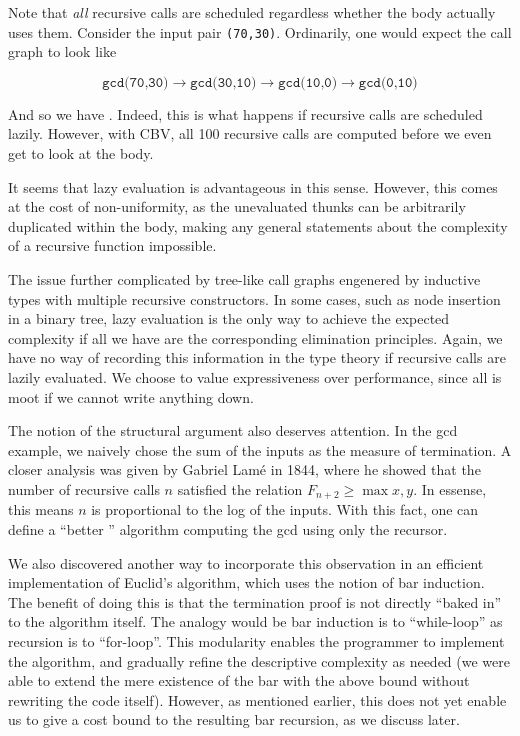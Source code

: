 Note that \emph{all} recursive calls are scheduled regardless whether the body actually 
uses them. Consider the input pair \texttt{(70,30)}. Ordinarily, one would expect the
call graph to look like 

\[
\texttt{gcd(70,30)} \to \texttt{gcd(30,10)} \to \texttt{gcd(10,0)} \to \texttt{gcd(0,10)} 
\]

And so we have . Indeed, this is what happens if recursive calls 
are scheduled lazily. However, with CBV, all 100 recursive calls are 
computed before we even get to look at the body. 

It seems that lazy evaluation is advantageous in this sense. However, this comes at the 
cost of non-uniformity, as the unevaluated thunks can be arbitrarily duplicated within
the body, making any general statements about the complexity of a recursive function 
impossible. 

The issue further complicated by tree-like call graphs engenered by inductive types with
multiple recursive constructors. In some cases, such as node insertion in a binary tree,
lazy evaluation is the only way to achieve the expected complexity if all we have 
are the corresponding elimination principles. Again, we have no way of recording this 
information in the type theory if recursive calls are lazily evaluated. We choose to 
value expressiveness over performance, since all is moot if we cannot write anything 
down. 

The notion of the structural argument also deserves attention. In the gcd example, we 
naively chose the sum of the inputs as the measure of termination. A closer analysis 
was given by Gabriel Lam\'{e} in 1844, where he showed that the number of recursive calls
$n$ satisfied the relation $F_{n+2} \ge \max{x,y}$. In essense, this means $n$ is
proportional to the log of the inputs. With this fact, one can define a ``better '' 
algorithm computing the gcd using only the recursor. 

We also discovered another way to incorporate this observation in an efficient
implementation of Euclid's algorithm, which uses the notion of bar induction.
The benefit of doing this is that the termination proof is not 
directly ``baked in'' to the algorithm itself. The analogy would be 
bar induction is to ``while-loop'' as recursion is to ``for-loop''.
This modularity enables the programmer to implement the algorithm, and gradually 
refine the descriptive complexity as needed 
(we were able to extend  the mere existence of 
the bar with the above bound without rewriting the code itself). However, as mentioned
earlier, this does not yet enable us to give a cost bound to the resulting bar 
recursion, as we discuss later.

